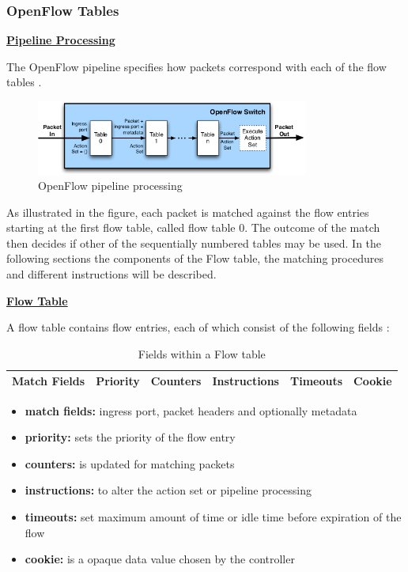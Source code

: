 \subsubsection{OpenFlow Tables}

\textbf{\underline{Pipeline Processing}}

The OpenFlow pipeline specifies how packets correspond with each of the flow tables \cite{ofspecification}. 

\begin{figure}[H]
\centering
\includegraphics[width=0.8\textwidth]{images/fundamentals/openflow_pipeline_processing.png}
\caption{OpenFlow pipeline processing}
\end{figure}

As illustrated in the figure, each packet is matched against the flow entries starting at the first flow table, called flow table 0. The outcome of the match then decides if other of the sequentially numbered tables may be used. In the following sections the components of the Flow table, the matching procedures and different instructions will be described.


\textbf{\underline{Flow Table}}

A flow table contains flow entries, each of which consist of the following fields \cite{ofspecification}: 

\begin{table}[H]
\centering

\begin{tabular}{|c|c|c|c|c|c|}
\hline Match Fields & Priority & Counters & Instructions & Timeouts & Cookie \\ 
\hline 
\end{tabular} 

\caption{Fields within a Flow table}
\end{table}

\begin{itemize}
\item \textbf{match fields:} ingress port, packet headers and optionally metadata
\item \textbf{priority:} sets the priority of the flow entry
\item \textbf{counters:} is updated for matching packets
\item \textbf{instructions:} to alter the action set or pipeline processing
\item \textbf{timeouts:} set maximum amount of time or idle time before expiration of the flow
\item \textbf{cookie:} is a opaque data value chosen by the controller
\end{itemize}

